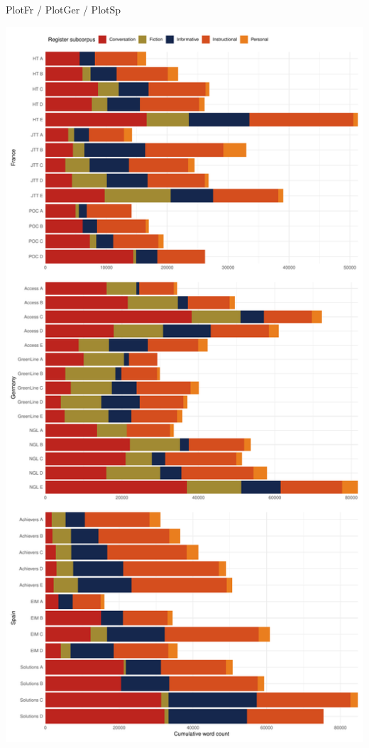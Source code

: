 \documentclass[
  letterpaper,
  DIV=11,
  numbers=noendperiod]{scrreprt}
\newenvironment{Shaded}{\begin{snugshade}}{\end{snugshade}}
\newcommand{\NormalTok}[1]{\textcolor[rgb]{0.00,0.23,0.31}{#1}}
\newcommand{\SpecialCharTok}[1]{\textcolor[rgb]{0.37,0.37,0.37}{#1}}
\begin{document}
\begin{Shaded}
\begin{Highlighting}[]
\NormalTok{PlotFr }\SpecialCharTok{/}
\NormalTok{PlotGer }\SpecialCharTok{/}
\NormalTok{PlotSp}
\end{Highlighting}
\end{Shaded}

\includegraphics{Ch6_data_prep_files/figure-pdf/TEC-metadata-1.pdf}
\end{document}
